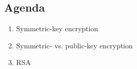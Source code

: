 

\subsection{Agenda}
\begin{enumerate}
\item Symmetric-key encryption
\item Symmetric- vs. public-key encryption
\item RSA
\end{enumerate}
